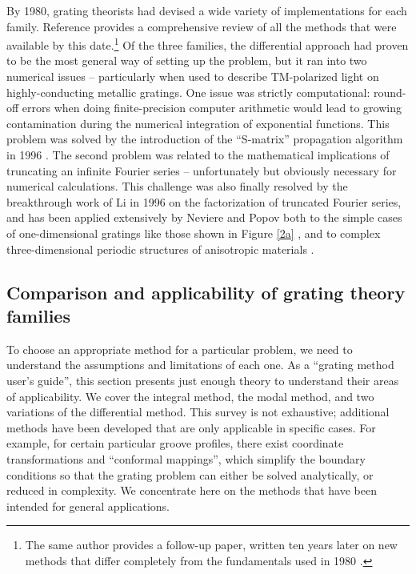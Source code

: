 By 1980, grating theorists had devised a wide variety of implementations for each family.  %
Reference \cite{Pet80} provides a comprehensive review of all the methods that were available by this date.\footnote{The same author provides a follow-up paper, written ten years later on new methods that differ completely from the fundamentals used in 1980 \cite{Pet90}.}  Of the three families, the differential approach had proven to be the most general way of setting up the problem, but it ran into two numerical issues -- particularly when used to describe TM-polarized light on highly-conducting metallic gratings.  One issue was strictly computational: round-off errors when doing finite-precision computer arithmetic would lead to growing contamination during the numerical integration of exponential functions.  This problem was solved by the introduction of the ``S-matrix'' propagation algorithm in 1996 \cite{Li96}\cite{Mon98}.  The second problem was related to the mathematical implications of truncating an infinite Fourier series -- unfortunately but obviously necessary for numerical calculations.  This challenge was also finally resolved by the breakthrough work of Li \cite{Li96b} in 1996 on the factorization of truncated Fourier series, and has been applied extensively by Neviere and Popov both to the simple cases of one-dimensional gratings like those shown in Figure \ref{2a} \cite{Pop01}, and to complex three-dimensional periodic structures of anisotropic materials \cite{Pop00}\cite{Nev02}.

\subsection{Comparison and applicability of grating theory families}
\label{methodComparison}
To choose an appropriate method for a particular problem, we need to understand the assumptions and limitations of each one.  As a ``grating method user's guide'', this section presents just enough theory to understand their areas of applicability.  We cover the integral method, the modal method, and two variations of the differential method.  This survey is not exhaustive; additional methods have been developed that are only applicable in specific cases.  For example, for certain particular groove profiles, there exist coordinate transformations and ``conformal mappings'', which simplify the boundary conditions so that the grating problem can either be solved analytically, or reduced in complexity.  We concentrate here on the methods that have been intended for general applications.
